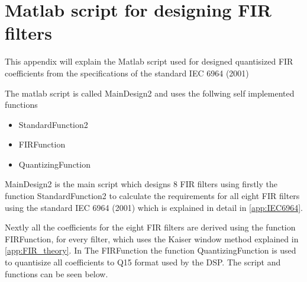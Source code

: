 \chapter{Matlab script for designing FIR filters} \label{app:FIR_Matlab}
This appendix will explain the Matlab script used for designed quantisized FIR coefficients from the specifications of the standard IEC 6964 (2001) 

The matlab script is called MainDesign2 and uses the follwing self implemented functions
\begin{itemize}
\item StandardFunction2
\item FIRFunction
\item QuantizingFunction
\end{itemize}
MainDesign2 is the main script which designs 8 FIR filters using firstly the function StandardFunction2 to calculate the requirements for all eight FIR filters using the standard IEC 6964 (2001) which is explained in detail in \autoref{app:IEC6964}.

Nextly all the coefficients for the eight FIR filters are derived using the function FIRFunction, for every filter, which uses the Kaiser window method explained in \autoref{app:FIR_theory}. In The FIRFunction the function QuantizingFunction is used to quantisize all coefficients to Q15 format used by the DSP. The script and functions can be seen below. 


